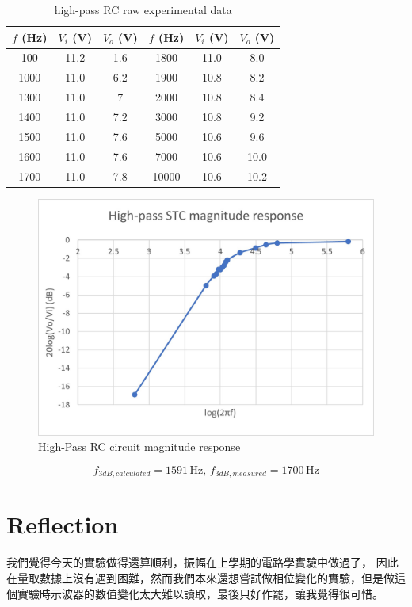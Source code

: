 \documentclass{article}
\begin{document}
\begin{CJK*}{UTF8}{bkai}
\begin{minipage}{0.45\textwidth}
\begin{table}[H]
\begin{tabular}{|c|c|c||c|c|c|}
    \hline
    $f$ (\unit{\hertz}) &  $V_i$ (V)& $V_o$ (V) & $f$ (\unit{\hertz}) &  $V_i$ (V)& $V_o$ (V)\\
    \hline\hline
    100	    & 11.2 & 1.6 & 1800 & 11.0 & 8.0  \\
    1000    & 11.0 & 6.2 & 1900 & 10.8 & 8.2 \\
    1300	& 11.0 & 7 & 2000 & 10.8 & 8.4 \\
    1400	& 11.0 & 7.2 & 3000 & 10.8 & 9.2\\
    1500	& 11.0 & 7.6 & 5000 & 10.6 & 9.6\\
    1600	& 11.0 & 7.6 & 7000 & 10.6 & 10.0\\
    1700	& 11.0 & 7.8 & 10000 & 10.6 & 10.2 \\
 \hline
\end{tabular}
\caption{high-pass RC raw experimental data}
\end{table}    
\end{minipage}\hspace{25mm}
\begin{minipage}{0.45\textwidth}
\begin{figure}[H]
    \includegraphics[scale=0.65]{highpassstc.jpg}
    \caption{High-Pass RC circuit magnitude response}
\end{figure}
\end{minipage}
\begin{equation*}
    f_{3dB,calculated} = 1591 \,\unit{\hertz},\,f_{3dB,measured} = 1700\,\unit{\hertz}
\end{equation*}

\section*{Reflection}
我們覺得今天的實驗做得還算順利，振幅在上學期的電路學實驗中做過了，
因此在量取數據上沒有遇到困難，然而我們本來還想嘗試做相位變化的實驗，但是做這個實驗時示波器的數值變化太大難以讀取，最後只好作罷，讓我覺得很可惜。
\end{CJK*}
\end{document}
